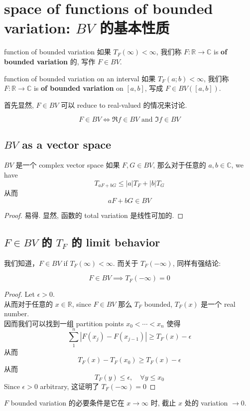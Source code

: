 \documentclass[lang=cn,11pt]{elegantbook}
\begin{document}
\section{space of functions of bounded variation: $BV$ 的基本性质 }

\begin{definition}{function of bounded variation}
 如果 $T_F(\infty) < \infty$, 我们称 $F:\mathbb{R}\to \mathbb{C}$ is \textbf{of bounded variation} 的, 写作 $F \in BV$.
\end{definition}

\begin{definition}{function of bounded variation on an interval}
如果 $T_F(a;b) < \infty$,  我们称 $F:\mathbb{R}\to \mathbb{C}$ is \textbf{of bounded variation} on $[a,b]$, 写成 $F \in BV([a,b])$.
\end{definition}

首先显然, $F\in BV$ 可以 reduce to real-valued 的情况来讨论.
\begin{proposition}\[
    F \in BV \iff \Re f \in BV \text{ and } \Im f \in BV
    \]
\end{proposition}


\subsection{$BV$ as a vector space }

\begin{lemma}{$BV$ 是一个 complex vector space}
    如果 $F,G \in BV$, 那么对于任意的 $a,b\in \mathbb{C}$, we have \[ T_{aF + bG}  \leq |a| T_F + |b| T_G   \]
    从而$$aF + bG \in BV$$
\end{lemma}
\begin{proof}
易得. 显然, 函数的 total variation 是线性可加的.
\end{proof}

\subsection{$F\in BV$ 的 $T_F$ 的 limit behavior}

我们知道，$F\in BV$ if $T_F(\infty) < \infty$. 而关于 $ T_F(-\infty)$, 同样有强结论:
\begin{proposition} \[
F \in BV \implies T_F(-\infty)  = 0
\]
\end{proposition}
\begin{proof}
    Let $\epsilon  > 0$.\\
    从而对于任意的 $x \in \mathbb{R}$, since $F\in BV$ 那么 $T_F$ bounded, $T_F(x)$ 是一个 real number.\\
    因而我们可以找到一组 partition points $x_0 < \cdots < x_n$ 使得 \[
    \sum_{1}^n |F(x_j)- F(x_{j-1})| \geq T_F(x) - \epsilon
    \]从而 \[
    T_F(x) - T_F(x_0) \geq T_F(x) - \epsilon
    \]从而 \[
    T_F(y) \leq \epsilon,\quad \forall y\leq x_0
    \]
Since $\epsilon  > 0$ arbitrary, 这证明了 $T_F(-\infty) = 0$
\end{proof}
\begin{remark}
$F$ bounded variation 的必要条件是它在 $x \to \infty$ 时, 截止 $x$ 处的 variation $\to 0$. 
\end{remark}
\end{document}
